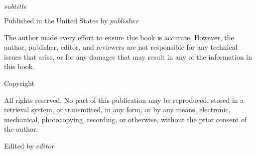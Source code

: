 \documentclass%
[12pt] %
{book} %
\def\subtitle{$subtitle$}
\def\editor{$editor$}
\def\publisher{$publisher$}
\begin{document}
  \begin{center}

  \makeatletter  \scriptsize \@title \par \makeatother

    \vspace{0.3cm}

    \makeatletter \subtitle \makeatother \par

    \vspace{0.3cm}

    \scriptsize Published in the United States by \publisher \par

    \vspace{0.3cm}

    \scriptsize The author made every effort to ensure this book is accurate. However, the author, publisher, editor, and reviewers are not responsible for any technical issues that arise, or for any damages that may result in any of the information in this book.\par

    \scriptsize Copyright \textcopyright \makeatletter \@date \ \@author \makeatother \par
    \scriptsize All rights reserved. No part of this publication may be reproduced, stored in a retrieval system, or transmitted, in any form, or by any means, electronic, mechanical, photocopying, recording, or otherwise, without the prior consent of the author. \par

  \end{center}

    \vspace{.3cm}

    \begin{center}

    \scriptsize Edited by \editor \par

      \vspace{0.3cm}

    \end{center}

\clearpage \normalsize
\end{document}
